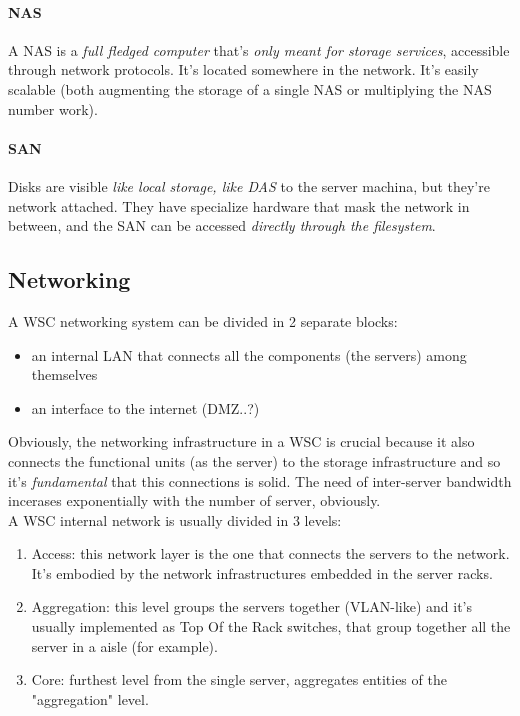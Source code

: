 \documentclass[10pt,a4paper]{article}
\begin{document}
					\paragraph{NAS}
						A NAS is a \emph{full fledged computer} that's \emph{only meant for storage services}, accessible through network protocols. It's located somewhere in the network. It's easily scalable (both augmenting the storage of a single NAS or multiplying the NAS number work).
					
					\paragraph{SAN}
						Disks are visible \emph{like local storage, like DAS} to the server machina, but they're network attached. They have specialize hardware that mask the network in between, and the SAN can be accessed \emph{directly through the filesystem}. 
				
			\subsection{Networking}
				A WSC networking system can be divided in 2 separate blocks:
				\begin{itemize}
					\item an internal LAN that connects all the components (the servers) among themselves
					\item an interface to the internet (DMZ..?)
				\end{itemize}
				
				Obviously, the networking infrastructure in a WSC is crucial because it also connects the functional units (as the server) to the storage infrastructure and so it's \emph{fundamental} that this connections is solid. The need of inter-server bandwidth incerases exponentially with the number of server, obviously.\\
				A WSC internal network is usually divided in 3 levels:
				\begin{enumerate}
					\item Access: this network layer is the one that connects the servers to the network. It's embodied by the network infrastructures embedded in the server racks.
					\item Aggregation: this level groups the servers together (VLAN-like) and it's usually implemented as Top Of the Rack switches, that group together all the server in a aisle (for example).
					\item Core: furthest level from the single server, aggregates entities of the "aggregation" level.
				\end{enumerate}
				
\end{document}
